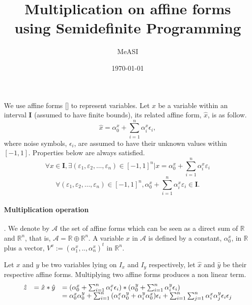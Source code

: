 \documentclass[a4paper,10pt]{article}
\title{Multiplication on affine forms using Semidefinite Programming}
\author{MeASI}
\date{\today}
\begin{document}
\maketitle

We use affine forms [\cite{affineArithmetic}] to represent variables. 
Let $x$ be a variable within an interval $\textbf{I}$ (assumed to have finite bounds), its related affine form, $\hat{x}$, is as follow.
$$
\hat{x} = \alpha_0^x + \sum_{i=1}^n{\alpha_i^x\epsilon_i},
$$
where noise symbols, $\epsilon_i$, are assumed to have their unknown values within $[-1,1]$.
Properties below are always satisfied.
$$
\forall x \in \textbf{I}, \exists (\varepsilon_1,\varepsilon_2,\dots{},\varepsilon_n) \in [-1,1]^n | x = \alpha_0^x + \sum_{i=1}^n{\alpha_i^x\varepsilon_i}
$$
$$
\forall (\varepsilon_1,\varepsilon_2,\dots{},\varepsilon_n) \in [-1,1]^n, \alpha_0^x + \sum_{i=1}^n{\alpha_i^x\varepsilon_i} \in \textbf{I}.
$$

\paragraph{Multiplication operation}. 
We denote by $\mathcal{A}$ the set of affine forms which can be seen as a direct sum of $\mathbb{R}$ and $\mathbb{R}^n$, that is, $\mathcal{A} = \mathbb{R} \oplus \mathbb{R}^n$.
A variable $x$ in $\mathcal{A}$ is defined by a constant, $\alpha_0^x$, in $\mathbb{R}$ plus a vector, $V^x := (\alpha_1^x,..,\alpha_n^x)^t$ in $\mathbb{R}^n$.

Let $x$ and $y$ be two variables lying on \textbf{$I_x$} and \textbf{$I_y$} respectively, let $\hat{x}$ and $\hat{y}$ be their respective affine forms.
Multiplying two affine forms produces a non linear term.
$$
\begin{array}{l l l}
\hat{z} &= \hat{x} * \hat{y} &= (\alpha_0^x + \sum_{i=1}^n{\alpha_i^x\epsilon_i}) * (\alpha_0^y + \sum_{i=1}^n{\alpha_i^y\epsilon_i}) \\
   &    &= \alpha_0^x\alpha_0^y + \sum_{i=1}^n{(\alpha_i^x\alpha_0^y + \alpha_i^y\alpha_0^x)\epsilon_i} + \sum_{i=1}^n\sum_{j=1}^n{\alpha_i^x\alpha_j^y\epsilon_i\epsilon_j} \\
\end{array}
$$
\end{document}
